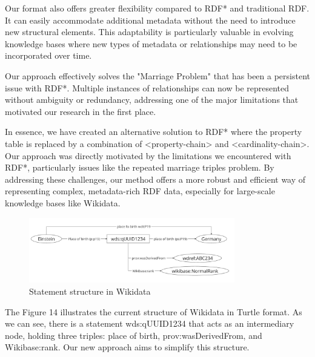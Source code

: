
Our format also offers greater flexibility compared to RDF* and traditional RDF. It can easily accommodate additional metadata without the need to introduce new structural elements. This adaptability is particularly valuable in evolving knowledge bases where new types of metadata or relationships may need to be incorporated over time.

Our approach effectively solves the "Marriage Problem" that has been a persistent issue with RDF*. Multiple instances of relationships can now be represented without ambiguity or redundancy, addressing one of the major limitations that motivated our research in the first place.

In essence, we have created an alternative solution to RDF* where the property table is replaced by a combination of <property-chain> and <cardinality-chain>. Our approach was directly motivated by the limitations we encountered with RDF*, particularly issues like the repeated marriage triples problem. By addressing these challenges, our method offers a more robust and efficient way of representing complex, metadata-rich RDF data, especially for large-scale knowledge bases like Wikidata.

    
\begin{figure}[htbp]
    \centering
    \includegraphics[width=0.8\textwidth]{14.png}
    \caption{Statement structure in Wikidata}
    \label{fig:image14}
\end{figure}

The Figure 14 illustrates the current structure of Wikidata in Turtle format. As we can see, there is a statement wds:qUUID1234 that acts as an intermediary node, holding three triples: place of birth, prov:wasDerivedFrom, and Wikibase:rank. Our new approach aims to simplify this structure.

